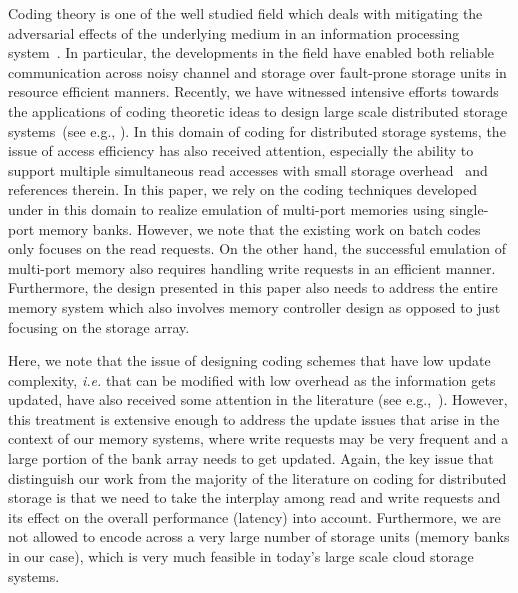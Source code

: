 Coding theory is one of the well studied field which deals with mitigating the adversarial effects of the underlying medium in an information processing system~\cite{MacSlo, Cover}. In particular, the developments in the field have enabled both reliable communication across noisy channel and storage over fault-prone storage units in resource efficient manners. Recently, we have witnessed intensive efforts towards the applications of coding theoretic ideas to design large scale distributed storage systems~(see e.g., \cite{Azure, SAPDVCB13, Rashmi14}). In this domain of coding for distributed storage systems, the issue of access efficiency has also received attention, especially the ability to support multiple simultaneous read accesses with small storage overhead~\cite{batchcodes, RPDV16, RSDG16, Wang2017} and references therein. In this paper, we rely on the coding techniques developed under in this domain to realize emulation of multi-port memories using single-port memory banks. However, we note that the existing work on batch codes~\cite{batchcodes} only focuses on the read requests. On the other hand, the successful emulation of multi-port memory also requires handling write requests in an efficient manner. Furthermore, the design presented in this paper also needs to address the entire memory system which also involves memory controller design as opposed to just focusing on the storage array. 


Here, we note that the issue of designing coding schemes that have low update complexity, \textit{i.e.} that can be modified with low overhead as the information gets updated, have also received some attention in the literature (see e.g.,~\cite{ASV10, MCW14}). However, this treatment is extensive enough to address the update issues that arise in the context of our memory systems, where write requests may be very frequent and a large portion of the bank array needs to get updated. Again, the key issue that distinguish our work from the majority of the literature on coding for distributed storage is that we need to take the interplay among read and write requests and its effect on the overall performance (latency) into account. Furthermore, we  are not allowed to encode across a very large number of storage units (memory banks in our case), which is very much feasible in today's large scale cloud storage systems.

